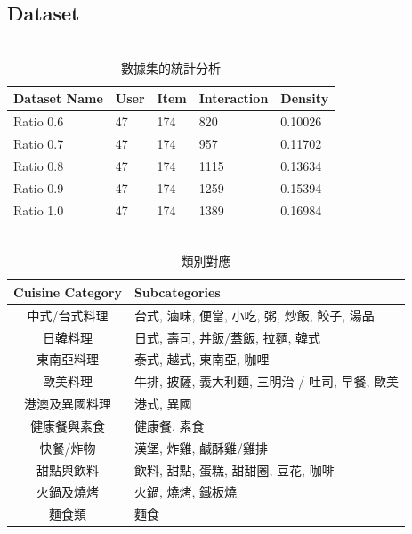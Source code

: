     \subsection{Dataset}
        \begin{table}[h]
            \centering
            \caption{\\ 數據集的統計分析}
            \begin{tabular}{lllll}
            \toprule
            \textbf{Dataset Name} & \textbf{User} & \textbf{Item} & \textbf{Interaction} & \textbf{Density} \\
            \hline
            Ratio 0.6 & 47 & 174 & 820 & 0.10026 \\
            \hline
            Ratio 0.7 & 47 & 174 & 957 & 0.11702 \\
            \hline
            Ratio 0.8 & 47 & 174 & 1115 & 0.13634 \\
            \hline
            Ratio 0.9 & 47 & 174 & 1259 & 0.15394 \\
            \hline
            Ratio 1.0 & 47 & 174 & 1389 & 0.16984 \\
            \hline
            \end{tabular}
            \label{table2}
        \end{table}
        \begin{table}[h]
            \centering
            \caption{\\ 類別對應}
            \renewcommand{\arraystretch}{1.5}
            \begin{tabular}{|c|p{}|}
            \hline
            \textbf{Cuisine Category} & \textbf{Subcategories} \\
            \hline
            {中式/台式料理} & 台式, 滷味, 便當, 小吃, 粥, 炒飯, \newline 餃子, 湯品 \\
            \hline
            日韓料理 & 日式, 壽司, 丼飯/蓋飯, 拉麵, 韓式 \\
            \hline
            東南亞料理 & 泰式, 越式, 東南亞, 咖哩 \\
            \hline
            歐美料理 & 牛排, 披薩, 義大利麵, 三明治 / 吐司, \newline 早餐, 歐美 \\
            \hline
            港澳及異國料理 & 港式, 異國 \\
            \hline
            健康餐與素食 & 健康餐, 素食 \\
            \hline
            快餐/炸物 & 漢堡, 炸雞, 鹹酥雞/雞排 \\
            \hline
            甜點與飲料 & 飲料, 甜點, 蛋糕, 甜甜圈, 豆花, 咖啡 \\
            \hline
            火鍋及燒烤 & 火鍋, 燒烤, 鐵板燒 \\
            \hline
            麵食類 & 麵食 \\
            \hline
            \end{tabular}
            \label{table3}
        \end{table}
        
